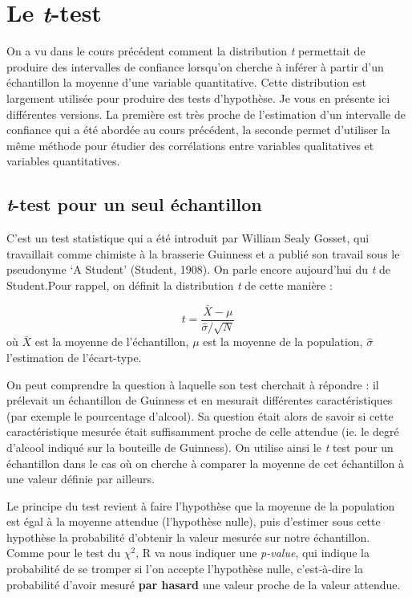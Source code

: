 \documentclass[
  french,
]{book}
\begin{document}
\hypertarget{le-t-test}{%
\section{\texorpdfstring{Le \emph{t}-test}{Le t-test}}\label{le-t-test}}

On a vu dans le cours précédent comment la distribution \emph{t} permettait de produire des intervalles de confiance lorsqu'on cherche à inférer à partir d'un échantillon la moyenne d'une variable quantitative. Cette distribution est largement utilisée pour produire des tests d'hypothèse. Je vous en présente ici différentes versions. La première est très proche de l'estimation d'un intervalle de confiance qui a été abordée au cours précédent, la seconde permet d'utiliser la même méthode pour étudier des corrélations entre variables qualitatives et variables quantitatives.

\hypertarget{t-test-pour-un-seul-uxe9chantillon}{%
\subsection{\texorpdfstring{\emph{t}-test pour un seul échantillon}{t-test pour un seul échantillon}}\label{t-test-pour-un-seul-uxe9chantillon}}

C'est un test statistique qui a été introduit par William Sealy Gosset,
qui travaillait comme chimiste à la brasserie Guinness et a publié son
travail sous le pseudonyme `A Student' (Student, 1908). On parle encore
aujourd'hui du \emph{t} de Student.Pour rappel, on définit la distribution \emph{t} de cette manière :

\[ t = \frac{\bar{X} - \mu}{\hat{\sigma}/\sqrt{N}}\] où \(\bar{X}\) est la
moyenne de l'échantillon, \(\mu\) est la moyenne de la population,
\(\hat{\sigma}\) l'estimation de l'écart-type.

On peut comprendre la question à laquelle son test cherchait à répondre : il prélevait un échantillon de Guinness et en mesurait différentes caractéristiques (par exemple le pourcentage d'alcool). Sa question était alors de savoir si cette caractéristique mesurée était suffisamment proche de celle attendue (ie. le degré d'alcool indiqué sur la bouteille de Guinness). On utilise ainsi le \emph{t} test pour un échantillon dans le cas où on cherche à comparer la moyenne de cet échantillon à une valeur définie par ailleurs.

Le principe du test revient à faire l'hypothèse que la moyenne de la population est égal à la moyenne attendue (l'hypothèse nulle), puis d'estimer sous cette hypothèse la probabilité d'obtenir la valeur mesurée sur notre échantillon. Comme pour le test du \(\chi^2\), R va nous indiquer une \emph{p-value}, qui indique la probabilité de se tromper si l'on accepte l'hypothèse nulle, c'est-à-dire la probabilité d'avoir mesuré \textbf{par hasard} une valeur proche de la valeur attendue.
\end{document}
